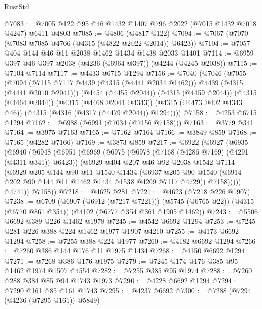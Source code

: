 \begin{lexlean}{RustStd}
\begin{coremodule}
@7083 := @7005 @122 @95 @46 @1432 @1407 @796 @2022 (@7015 @1432 @7018 @4247) @6411 @4803
@7085 := @4806 (@4817 @122)
@7094 := @7067 (@7070 (@7083 @7085 @4766 (@4315 (@4822 @2022 @2014)) @6423))
@7104 := @7057 @404 @144 @46 @11 @2038 @1462 @1434 @1438 @2033 @1401
@7114 := @6959 @397 @46 @397 @2038 (@4236 (@6964 @397)) (@4244 (@4245 @2038))
@7115 := @7104 @7114
@7117 := @4433 @6715 @1294
@7156 := @7040
    (@7046
      (@7055
        (@7094 (@7115 @7117 @4439 (@4315 (@4441 @2034 @1462))) @4439 (@4315 (@4441 @2010 @2041)))
        (@4454 (@4455 @2044))
        (@4315 (@4459 @2044))
        (@4315 (@4464 @2044))
        (@4315 (@4468 @2044 @4343))
        (@4315 (@4473 @402 @4343 @46))
        (@4315 (@4316 (@4317 (@4479 @2044)) @1294))))
@7158 := @4253 @6715 @1294
@7162 := @6988 (@6991 (@7034 (@7156 @7158)))
@7163 := @3779 @341
@7164 := @3975 @7163
@7165 := @7162 @7164
@7166 := @3849 @859
@7168 := @7165 (@4282 @7166)
@7169 := @3873 @859
@7217 := @6922
    (@6927
      (@6935
        (@6940
          (@6948
            (@6951
              (@6969
                (@6975
                  (@6978 (@7168 (@4286 @7169) (@4291 (@4311 @341)) @6423))
                  (@6929
                    @404
                    @207
                    @46
                    @92
                    @2038
                    @1542
                    @7114
                    (@6929
                      @205
                      @144
                      @90
                      @11
                      @1540
                      @1434
                      (@6937
                        @205
                        @90
                        @1540
                        (@6914 @202 @90 @144 @11 @1462 @1434 @1538 @4209 @7117 @4729))
                      @7158)))))
            @4741))
        @7158))
@7218 := @4625 @281
@7221 := @4623 (@7218 @226 @1907)
@7238 := @6709
    (@6907 (@6912 (@7217 @7221)))
    (@5745 (@6765 @22))
    (@4315 (@6770 @861 @354))
    (@4102 (@6777 @354 @361 @1905 @1462))
@7243 := @5506 @6692 @389 @226 @1462 @1978
@7245 := @4542 @6692 @1294
@7253 := @7245 @281 @226 @388 @224 @1462 @1977 @1907 @4210
@7255 := @4173 @6692 @1294
@7258 := @7255 @388 @224 @1977
@7260 := @4182 @6692 @1294
@7266 := @7260 @386 @144 @176 @11 @1975 @1434
@7268 := @4150 @6692 @1294
@7271 := @7268 @386 @176 @1975
@7279 := @7245 @174 @176 @385 @95 @1462 @1974 @1507 @4554
@7282 := @7255 @385 @95 @1974
@7288 := @7260 @288 @384 @85 @94 @1743 @1973
@7290 := @4228 @6692 @1294
@7294 := @7290 @161 @85 @161 @1743
@7295 := @4237 @6692
@7300 := @7288 (@7294 (@4236 (@7295 @161)) @5849)

\end{coremodule}
\end{lexlean}
